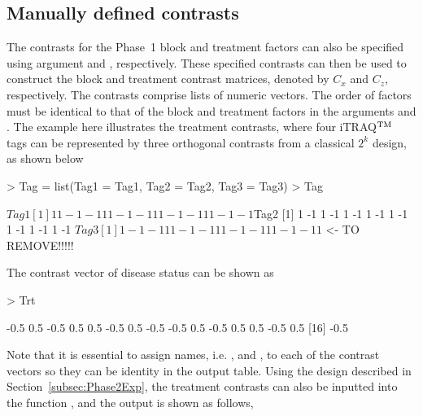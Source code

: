 \documentclass[article]{jss}
\begin{document}
\subsection{Manually defined contrasts}
The contrasts for the Phase~1 block and treatment factors can also be specified using argument  and , respectively. These specified contrasts can then be used to construct the block and treatment contrast matrices, denoted by $C_x$ and $C_z$, respectively. The contrasts comprise lists of numeric vectors. The order of factors must be identical to that of the block and treatment factors in the arguments  and . The example here illustrates the treatment contrasts, where four iTRAQ$^{\rm TM}$ tags can be represented by three orthogonal contrasts from a classical $2^k$ design, as shown below
\begin{CodeChunk}
\begin{CodeInput}
> Tag = list(Tag1 = Tag1, Tag2 = Tag2, Tag3 = Tag3)
> Tag
\end{CodeInput}
\begin{CodeOutput}
$Tag1
 [1]  1  1 -1 -1  1  1 -1 -1  1  1 -1 -1  1  1 -1 -1
$Tag2
 [1]  1 -1  1 -1  1 -1  1 -1  1 -1  1 -1  1 -1  1 -1
$Tag3
 [1]  1 -1 -1  1  1 -1 -1  1  1 -1 -1  1  1 -1 -1  1
$ <- TO REMOVE!!!!!
\end{CodeOutput}
\end{CodeChunk}
 The contrast vector of disease status can be shown as
\begin{CodeChunk}
\begin{CodeInput}
> Trt
\end{CodeInput}
\begin{CodeOutput}
 [1] -0.5  0.5 -0.5  0.5  0.5 -0.5  0.5 -0.5 -0.5  0.5 -0.5  0.5  0.5 -0.5  0.5
[16] -0.5
\end{CodeOutput}
\end{CodeChunk}
Note that it is essential to assign names, i.e. ,  and , to each of the contrast vectors so they can be identity in the output table. Using the design described in Section~\ref{subsec:Phase2Exp}, the treatment contrasts can also be inputted into the function , and the output is shown as follows,
\end{document}
